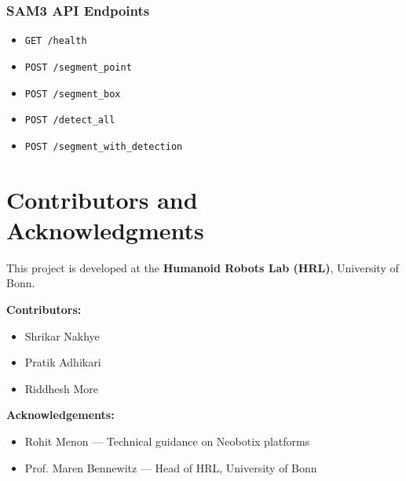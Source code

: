 \documentclass[12pt,oneside,a4paper]{article}
\begin{document}
\subsubsection{SAM3 API Endpoints}

\begin{itemize}
    \item \texttt{GET /health}
    \item \texttt{POST /segment\_point}
    \item \texttt{POST /segment\_box}
    \item \texttt{POST /detect\_all}
    \item \texttt{POST /segment\_with\_detection}
\end{itemize}

\section{Contributors and Acknowledgments}

This project is developed at the \textbf{Humanoid Robots Lab (HRL)}, University of Bonn.

\textbf{Contributors:}
\begin{itemize}
    \item Shrikar Nakhye
    \item Pratik Adhikari
    \item Riddhesh More
\end{itemize}

\textbf{Acknowledgements:}
\begin{itemize}
    \item Rohit Menon — Technical guidance on Neobotix platforms
    \item Prof. Maren Bennewitz — Head of HRL, University of Bonn
\end{itemize}


\clearpage

\end{document}
